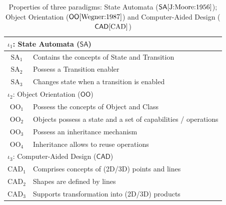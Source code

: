 \begin{table}[t]
   \begin{center}
      \begin{tabular}[t]{c l}
         \hline
         \multicolumn{2}{l}{$\iota_1$: State Automata ($\mathsf{SA}$)}\\
         \hline
         $\mbox{SA}_1$ & Contains the concepts of State and Transition\\
         $\mbox{SA}_2$ & Possess a Transition enabler\\
         $\mbox{SA}_3$ & Changes state when a transition is enabled\\
         \hline\hline
         \multicolumn{2}{l}{$\iota_2$: Object Orientation ($\mathsf{OO}$)}\\
         \hline
         $\mbox{OO}_1$ & Possess the concepts of Object and Class\\
         $\mbox{OO}_2$ & Objects possess a state and a set of capabilities / operations \\
         $\mbox{OO}_3$ & Possess an inheritance mechanism\\
         $\mbox{OO}_4$ & Inheritance allows to reuse operations\\
         \hline\hline
         \multicolumn{2}{l}{$\iota_3$: Computer-Aided Design ($\mathsf{CAD}$)}\\
         \hline
         $\mbox{CAD}_1$ & Comprises concepts of (2D/3D) points and lines\\
         $\mbox{CAD}_2$ & Shapes are defined by lines\\
         $\mbox{CAD}_3$ & Supports transformation into (2D/3D) products\\
         \hline
      \end{tabular}
   \end{center}
   \label{tab:Properties}
   \caption{Properties of three paradigms: State Automata ($\mathsf{SA} 
\cite{J:Moore:1956}$); Object Orientation ($\mathsf{OO} \cite{Wegner:1987}$) 
and Computer-Aided Design ($\mathsf{CAD} \cite{CAD}$)}
\end{table}
